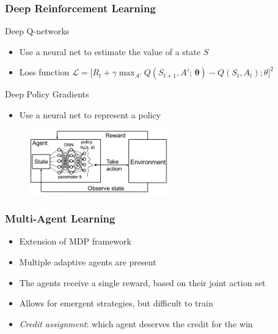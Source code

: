 \documentclass{beamer}
\begin{document}
\begin{frame}
\frametitle{Deep Reinforcement Learning}
\begin{block}{Deep Q-networks}
\begin{itemize}
    \item Use a neural net to estimate the value of a state $S$
    \item Loss function $\mathcal{L} = \big [R_t + \gamma \max_{A'} Q(S_{t+1}, A';\, \bm{\theta}) - Q(S_t, A_t); \theta \big ]^2$
\end{itemize}
\end{block}
\begin{block}{Deep Policy Gradients}
\begin{itemize}
    \item Use a neural net to represent a policy
\end{itemize}
\begin{figure}[htp]
    \centering
    \includegraphics[width=6cm]{images/deep_pg.png}
\end{figure}
\end{block}
\end{frame}

\begin{frame}
\frametitle{Multi-Agent Learning}
\begin{itemize}
    \item Extension of MDP framework
    \item Multiple adaptive agents are present
    \item The agents receive a single reward, based on their joint action set
    \item Allows for emergent strategies, but difficult to train
    \item \emph{Credit assignment}: which agent deserves the credit for the win
\end{itemize}
\end{frame}
\end{document}
